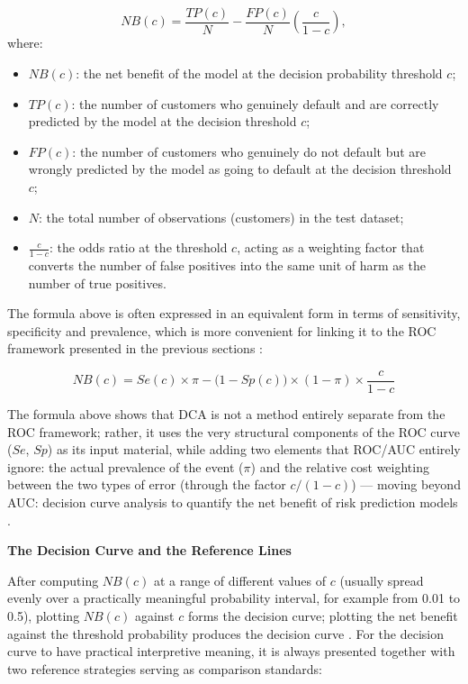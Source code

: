 \begin{equation}
    NB(c) = \frac{TP(c)}{N} - \frac{FP(c)}{N}\left(\frac{c}{1-c}\right),
\end{equation}
where:
\begin{itemize}
    \item $NB(c)$: the net benefit of the model at the decision probability threshold $c$;
    \item $TP(c)$: the number of customers who genuinely default and are correctly predicted by the model at the decision threshold $c$;
    \item $FP(c)$: the number of customers who genuinely do not default but are wrongly predicted by the model as going to default at the decision threshold $c$;
    \item $N$: the total number of observations (customers) in the test dataset;
    \item $\frac{c}{1-c}$: the odds ratio at the threshold $c$, acting as a weighting factor that converts the number of false positives into the same unit of harm as the number of true positives.
\end{itemize}

\vspace{1em}
The formula above is often expressed in an equivalent form in terms of sensitivity, specificity and prevalence, which is more convenient for linking it to the ROC framework presented in the previous sections \cite{vickers2019guide}:

\begin{equation}
    NB(c) = Se(c) \times \pi - \big(1 - Sp(c)\big) \times (1-\pi) \times \frac{c}{1-c}
\end{equation}

The formula above shows that DCA is not a method entirely separate from the ROC framework; rather, it uses the very structural components of the ROC curve ($Se$, $Sp$) as its input material, while adding two elements that ROC/AUC entirely ignore: the actual prevalence of the event ($\pi$) and the relative cost weighting between the two types of error (through the factor $c/(1-c)$) — moving beyond AUC: decision curve analysis to quantify the net benefit of risk prediction models \cite{sadatsafavi2021moving}.

\vspace{1em}
\noindent
\textbf{The Decision Curve and the Reference Lines}

\noindent
After computing $NB(c)$ at a range of different values of $c$ (usually spread evenly over a practically meaningful probability interval, for example from 0.01 to 0.5), plotting $NB(c)$ against $c$ forms the decision curve; plotting the net benefit against the threshold probability produces the decision curve \cite{vickers2006decision}. For the decision curve to have practical interpretive meaning, it is always presented together with two reference strategies serving as comparison standards:

